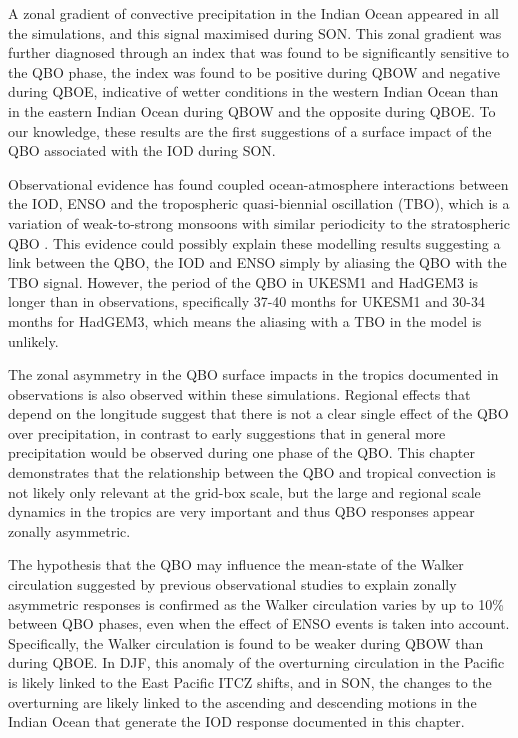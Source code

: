  A zonal gradient of convective precipitation in the Indian Ocean appeared in all the simulations, and this signal maximised during SON. 
 This zonal gradient was further diagnosed through an index that was found to be significantly sensitive to the QBO  phase, the index was found to be positive during QBOW and negative during QBOE, indicative of wetter conditions in the western Indian Ocean than in the eastern  Indian Ocean during QBOW and the opposite during QBOE. To our knowledge, these results are the first suggestions of a surface impact of the QBO associated with the IOD during SON.
 
Observational evidence has found coupled ocean-atmosphere interactions between the IOD, ENSO and the tropospheric quasi-biennial oscillation (TBO), which is a variation of weak-to-strong monsoons with similar periodicity to the stratospheric QBO \citep{meehl2003,pillai2010}. 
This evidence could possibly explain these modelling results suggesting a link between the QBO, the IOD and ENSO simply by aliasing the QBO with the TBO signal.
However, the period of the QBO in UKESM1 and HadGEM3 is longer than in observations, specifically 37-40 months for UKESM1 and 30-34 months for HadGEM3, which means the aliasing with a TBO in the model is unlikely.

 The zonal asymmetry in the QBO surface impacts in the tropics documented in observations \citep{collimore2003,liess2012,gray2018,lee2019} is also observed within these simulations. 
 Regional effects that depend on the longitude suggest that there is not a clear single effect of the QBO over precipitation, in contrast to early suggestions \citep{gray1984} that in general more precipitation would be observed during one phase of the QBO. 
 This chapter demonstrates that the relationship between the QBO and tropical convection is not likely only relevant at the grid-box scale, but the large and regional scale dynamics in the tropics are very important and thus QBO responses appear zonally asymmetric.
 
 The hypothesis that the QBO may influence the mean-state of the Walker circulation suggested by previous observational studies to explain zonally asymmetric responses \citep[e.g.][]{collimore2003,liess2012} is confirmed as the Walker circulation varies by up to 10\% between QBO phases, even when the effect of ENSO events is taken into account. 
 Specifically, the Walker circulation is found to be weaker during QBOW than during QBOE. In DJF, this anomaly of the overturning circulation in the Pacific is likely linked to the East Pacific ITCZ shifts, and in SON, the changes to the overturning are likely linked to the ascending and descending motions in the Indian Ocean that generate the IOD response documented in this chapter.
 
